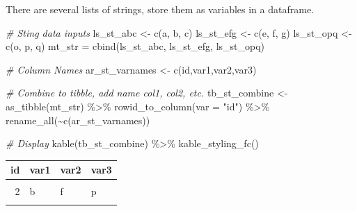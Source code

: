\documentclass[
]{book}
\newenvironment{Shaded}{\begin{snugshade}}{\end{snugshade}}
\newcommand{\AttributeTok}[1]{\textcolor[rgb]{0.77,0.63,0.00}{#1}}
\newcommand{\CommentTok}[1]{\textcolor[rgb]{0.56,0.35,0.01}{\textit{#1}}}
\newcommand{\FunctionTok}[1]{\textcolor[rgb]{0.00,0.00,0.00}{#1}}
\newcommand{\NormalTok}[1]{#1}
\newcommand{\OtherTok}[1]{\textcolor[rgb]{0.56,0.35,0.01}{#1}}
\newcommand{\SpecialCharTok}[1]{\textcolor[rgb]{0.00,0.00,0.00}{#1}}
\newcommand{\StringTok}[1]{\textcolor[rgb]{0.31,0.60,0.02}{#1}}
\begin{document}
There are several lists of strings, store them as variables in a dataframe.

\begin{Shaded}
\begin{Highlighting}[]
\CommentTok{\# Sting data inputs}
\NormalTok{ls\_st\_abc }\OtherTok{\textless{}{-}} \FunctionTok{c}\NormalTok{(}\StringTok{\textquotesingle{}a\textquotesingle{}}\NormalTok{, }\StringTok{\textquotesingle{}b\textquotesingle{}}\NormalTok{, }\StringTok{\textquotesingle{}c\textquotesingle{}}\NormalTok{)}
\NormalTok{ls\_st\_efg }\OtherTok{\textless{}{-}} \FunctionTok{c}\NormalTok{(}\StringTok{\textquotesingle{}e\textquotesingle{}}\NormalTok{, }\StringTok{\textquotesingle{}f\textquotesingle{}}\NormalTok{, }\StringTok{\textquotesingle{}g\textquotesingle{}}\NormalTok{)}
\NormalTok{ls\_st\_opq }\OtherTok{\textless{}{-}} \FunctionTok{c}\NormalTok{(}\StringTok{\textquotesingle{}o\textquotesingle{}}\NormalTok{, }\StringTok{\textquotesingle{}p\textquotesingle{}}\NormalTok{, }\StringTok{\textquotesingle{}q\textquotesingle{}}\NormalTok{)}
\NormalTok{mt\_str }\OtherTok{=} \FunctionTok{cbind}\NormalTok{(ls\_st\_abc, ls\_st\_efg, ls\_st\_opq)}

\CommentTok{\# Column Names}
\NormalTok{ar\_st\_varnames }\OtherTok{\textless{}{-}} \FunctionTok{c}\NormalTok{(}\StringTok{\textquotesingle{}id\textquotesingle{}}\NormalTok{,}\StringTok{\textquotesingle{}var1\textquotesingle{}}\NormalTok{,}\StringTok{\textquotesingle{}var2\textquotesingle{}}\NormalTok{,}\StringTok{\textquotesingle{}var3\textquotesingle{}}\NormalTok{)}

\CommentTok{\# Combine to tibble, add name col1, col2, etc.}
\NormalTok{tb\_st\_combine }\OtherTok{\textless{}{-}} \FunctionTok{as\_tibble}\NormalTok{(mt\_str) }\SpecialCharTok{\%\textgreater{}\%}
  \FunctionTok{rowid\_to\_column}\NormalTok{(}\AttributeTok{var =} \StringTok{"id"}\NormalTok{) }\SpecialCharTok{\%\textgreater{}\%}
  \FunctionTok{rename\_all}\NormalTok{(}\SpecialCharTok{\textasciitilde{}}\FunctionTok{c}\NormalTok{(ar\_st\_varnames))}

\CommentTok{\# Display}
\FunctionTok{kable}\NormalTok{(tb\_st\_combine) }\SpecialCharTok{\%\textgreater{}\%} \FunctionTok{kable\_styling\_fc}\NormalTok{()}
\end{Highlighting}
\end{Shaded}

\begin{table}[!h]
\centering
\begin{tabular}{r|l|l|l}
\hline
id & var1 & var2 & var3\\
\hline
\cellcolor{gray!6}{1} & \cellcolor{gray!6}{a} & \cellcolor{gray!6}{e} & \cellcolor{gray!6}{o}\\
\hline
2 & b & f & p\\
\hline
\cellcolor{gray!6}{3} & \cellcolor{gray!6}{c} & \cellcolor{gray!6}{g} & \cellcolor{gray!6}{q}\\
\hline
\end{tabular}
\end{table}
\end{document}
